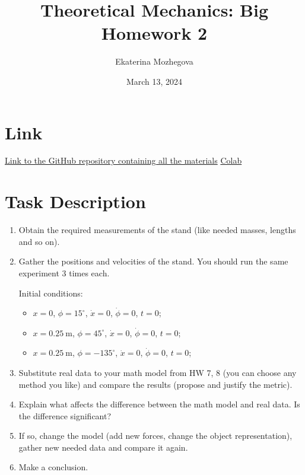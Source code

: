 \documentclass{article}
\title{Theoretical Mechanics: Big Homework 2}
\author{Ekaterina Mozhegova}
\date{March 13, 2024}
\begin{document}
\maketitle

\section{Link}
\href{https://github.com/illusoryTwin/Theoretical_mechanics/tree/master/hw7}{Link to the GitHub repository containing all the materials}
\href{https://colab.research.google.com/drive/1DiKK_ZvTILnPT2P7sJNKj1a4t78OqBTw?usp=sharing}{Colab}

\section{Task Description}
\begin{enumerate}
    \item Obtain the required measurements of the stand (like needed masses, lengths and so on).
    \item Gather the positions and velocities of the stand. You should run the same experiment 3 times each. 
    
    Initial conditions:
    \begin{itemize}
      \footnotesize
      \item $x = 0$, $\phi = 15^\circ$, $\dot{x} = 0$, $\dot{\phi} = 0$, $t=0$;
      \item $x = 0.25\ \text{m}$, $\phi = 45^\circ$, $\dot{x} = 0$, $\dot{\phi} = 0$, $t=0$;
      \item $x = 0.25\ \text{m}$, $\phi = -135^\circ$, $\dot{x} = 0$, $\dot{\phi} = 0$, $t=0$;
    \end{itemize}
    \item Substitute real data to your math model from HW 7, 8 (you can choose any method you like) and compare the results (propose and justify the metric).
    \item Explain what affects the difference between the math model and real data. Is the difference significant? 
    \item If so, change the model (add new forces, change the object representation), gather new needed data and compare it again.
    \item Make a conclusion.
\end{enumerate}
\end{document}
